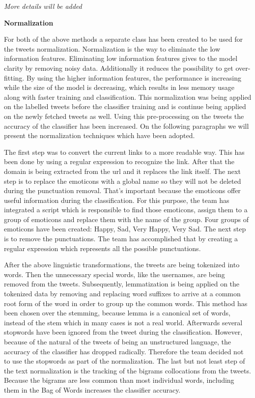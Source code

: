 \emph{More details will be added}

\textbf{Normalization}

For both of the above methods a separate class has been created to be used for the tweets normalization. Normalization is the way to eliminate the low information features. Eliminating low information features gives to the model clarity by removing noisy data. Additionally it reduces the possibility to get over-fitting. By using the higher information features, the performance is increasing while the size of the model is decreasing, which results in less memory usage along with faster training and classification. This normalization was being applied on the labelled tweets before the classifier training and is continue being applied on the newly fetched tweets as well. Using this pre-processing on the tweets the accuracy of the classifier has been increased. On the following paragraphs we will present the normalization techniques which have been adopted. 

The first step was to convert the current links to a more readable way. This has been done by using a regular expression to recognize the link. After that the domain is being extracted from the url and it replaces the link itself. The next step is to replace the emoticons with a global name so they will not be deleted during the punctuation removal. That’s important because the emoticons offer useful information during the classification. For this purpose, the team has integrated a script which is responsible to find those emoticons, assign them to a group of emoticons and replace them with the name of the group. Four groups of emoticons have been created: Happy, Sad, Very Happy, Very Sad. The next step is to remove the punctuations. The team has accomplished that by creating a regular expression which represents all the possible punctuations. 

After the above linguistic transformations, the tweets are being tokenized into words. Then the unnecessary special words, like the usernames, are being removed from the tweets. Subsequently, lemmatization is being applied on the tokenized data by removing and replacing word suffixes to arrive at a common root form of the word in order to group up the common words. This method has been chosen over the stemming, because lemma is a canonical set of words, instead of the stem which in many cases is not a real world. Afterwards several stopwords have been ignored from the tweet during the classification. However, because of the natural of the tweets of being an unstructured language, the accuracy of the classifier has dropped radically. Therefore the team decided not to use the stopwords as part of the normalization. The last but not least step of the text normalization is the tracking of the bigrams collocations from the tweets. Because the bigrams are less common than most individual words, including them in the Bag of Words increases the classifier accuracy.

